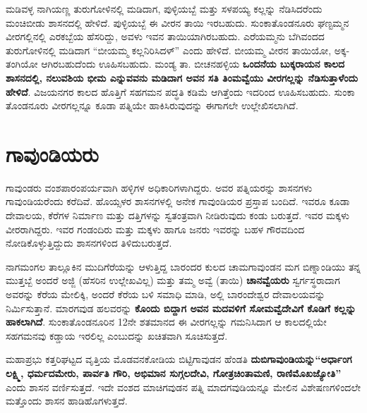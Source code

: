 ಮಡಿವಳ್ಳ ನಾಗಿಯಣ್ಣ ತುರುಗೋಳಿನಲ್ಲಿ ಮಡಿದಾಗ, ಪುಳ್ಳಿಯಬ್ಬೆ ಮತ್ತು ಸಳಪಯ್ಯ ಕಲ್ಲನ್ನು ನೆಡಿಸಿದರೆಂದು ಮಂಚಿಬೀಡು ಶಾಸನದಲ್ಲಿ ಹೇಳಿದೆ. ಪುಳ್ಳಿಯಬ್ಬೆ ಈ ವೀರನ ತಾಯಿ ಇರಬಹುದು. ಸುಂಕಾತೊಂಡನೂರು ಘಣ್ಟಮ್ಮನ ವೀರಗಲ್ಲಿನಲ್ಲಿ ಎರಕಬ್ಬೆಯ ಹೆಸರಿದ್ದು, ಅವಳು ಇವನ ತಾಯಿಯಾಗಿರಬಹುದು. ಎರೆಯಮ್ಮನು ಬೆಗಿವಂದದ ತುರುಗೋಳಿ\-ನಲ್ಲಿ ಮಡಿದಾಗ “ಬೀಯಮ್ಮ ಕಲ್ಲನಿರಿಸಿದಳ್​” ಎಂದು ಹೇಳಿದೆ. ಬೀಯಮ್ಮ ವೀರನ ತಾಯಿಯೋ, ಅಕ್ಕ-ತಂಗಿಯೋ ಆಗಿರಬಹುದೆಂದು ಊಹಿಸಬಹುದು. ಮಂಡ್ಯ ತಾ. ಬೀಚನಹಳ್ಳಿಯ \textbf{ಒಂದನೆಯ ಬುಕ್ಕರಾಯನ ಕಾಲದ ಶಾಸನದಲ್ಲಿ, ನಲುವಶಿಯ ಭೀಮ ಎನ್ನುವವನು ಮಡಿದಾಗ ಅವನ ಸತಿ ತಿಂಮವ್ವೆಯು ವೀರಗಲ್ಲನ್ನು ನೆಡಿಸುತ್ತಾಳೆಂದು ಹೇಳಿದೆ}. ವಿಜಯನಗರ ಕಾಲದ ಹೊತ್ತಿಗೆ ಸಹಗಮನ ಪದ್ಧತಿ ಕಡಿಮೆ ಆಗಿತ್ತೆಂದು ಇದರಿಂದ ಊಹಿಸಬಹುದು. ಸುಂಕಾ ತೊಂಡನೂರು ವೀರಗಲ್ಲನ್ನೂ ಕೂಡಾ ಪತ್ನಿಯೇ ಹಾಕಿಸಿರುವುದನ್ನು ಈಗಾಗಲೇ ಉಲ್ಲೇಖಿಸಲಾಗಿದೆ.


\section*{ಗಾವುಂಡಿಯರು}

ಗಾವುಂಡರು ವಂಶಪಾರಂಪರ್ಯವಾಗಿ ಹಳ್ಳಿಗಳ ಅಧಿಕಾರಿಗಳಾಗಿದ್ದರು. ಅವರ ಪತ್ನಿಯರನ್ನು ಶಾಸನಗಳು ಗಾವುಂಡಿಯರೆಂದು ಕರೆದಿವೆ. ಹೊಯ್ಸಳರ ಶಾಸನಗಳಲ್ಲಿ ಅನೇಕ ಗಾವುಂಡಿಯರ ಪ್ರಸ್ತಾಪ ಬಂದಿದೆ. ಇವರೂ ಕೂಡಾ ದೇವಾಲಯ, ಕೆರೆಗಳ ನಿರ್ಮಾಣ ಮತ್ತು ದತ್ತಿಗಳನ್ನು ಸ್ವತಂತ್ರವಾಗಿ ನೀಡಿರುವುದು ಕಂಡು ಬರುತ್ತದೆ. ಇವರ ಮಕ್ಕಳು ವೀರರಾಗಿದ್ದರು. ಇವರ ಗಂಡಂದಿರು ಮತ್ತು ಮಕ್ಕಳು ಹಾಗೂ ಜನರು ಇವರನ್ನು ಬಹಳ ಗೌರವದಿಂದ ನೋಡಿಕೊಳ್ಳುತ್ತಿದ್ದುದು ಶಾಸನಗಳಿಂದ ತಿಳಿದುಬರುತ್ತದೆ.

ನಾಗಮಂಗಲ ತಾಲ್ಲೂಕಿನ ಮುದಿಗೆರೆಯನ್ನು ಆಳುತ್ತಿದ್ದ ಬಾರಂದರ ಕುಲದ ಚಾಮಗಾವುಂಡನ ಮಗ ಬಿಣ್ನಾಂಡಿಯು ತನ್ನ ಮುತ್ತಬ್ಬೆ ಅಂದರೆ ಅಜ್ಜಿ (ಹೆಸರಿನ ಉಲ್ಲೇಖವಿಲ್ಲ) ಮತ್ತು ತಮ್ಮ ಅವ್ವೆ (ತಾಯಿ) \textbf{ಚಾನವ್ವೆಯರು} ಸ್ವರ್ಗಸ್ಥರಾದಾಗ ಅವರನ್ನು ಕೆರೆಯ ಮೇಲಿಕ್ಕಿ, ಅಂದರೆ ಕೆರೆಯ ಬಳಿ ಸಮಾಧಿ ಮಾಡಿ, ಅಲ್ಲಿ ಬಾರಂದೇಶ್ವರ ದೇವಾಲಯವನ್ನು ನಿರ್ಮಿಸುತ್ತಾನೆ. ಮಾರಗವುಡ ಹಲವರನ್ನು \textbf{ಕೊಂದು ಬಿದ್ದಾಗ ಅವನ ಮದವಳಿಗೆ ಸೋಮವ್ವೆದೇವಿಗೆ ಕೊಡಿಗೆ ಕಲ್ಲನ್ನು ಹಾಕಲಾಗಿದೆ}. ಸುಂಕಾತೊಂಡನೂರಿನ 12ನೇ ಶತಮಾನದ ಈ ವೀರಗಲ್ಲನ್ನು ಗಮನಿಸಿದಾಗ ಆ ಕಾಲದಲ್ಲಿಯೇ ಸಹಗಮನವು ಕಡ್ಡಾಯ ಇರಲಿಲ್ಲ ಎಂಬುದನ್ನು ಖಚಿತವಾಗಿ ಸೂಚಿಸುತ್ತದೆ.

ಮಹಾಪ್ರಭು ಕತ್ತರಿಘಟ್ಟದ ವೃತ್ತಿಯ ಮೊಡವನಕೋಡಿಯ ಬಿಟ್ಟಿಗಾವುಡನ ಹೆಂಡತಿ \textbf{ದುಬಿಗಾವುಂಡಿಯನ್ನು}\break \textbf{“ಅರ್ಧಾಂಗ ಲಕ್ಷ್ಮಿ, ಧರ್ಮದಮೇರು, ಪಾರ್ವತಿ ಗೌರಿ, ಅಭಿಮಾನ ಸುಗ್ಗಲದೇವಿ, ಗೋತ್ರಚಿಂತಾಮಣಿ, ರಾಣಿಮೊಖಜ್ಯೋತಿ”} ಎಂದು ಶಾಸನ ವರ್ಣಿಸುತ್ತದೆ. ಇದೇ ವಂಶದ ಮಾಚಿಗವುಡನ ಪತ್ನಿ ಮಾದಗವುಡಿಯನ್ನೂ ಮೇಲಿನ ವಿಶೇಷಣಗಳಿಂದಲೇ ಮತ್ತೊಂದು ಶಾಸನ ಹಾಡಿಹೊಗಳುತ್ತದೆ.

